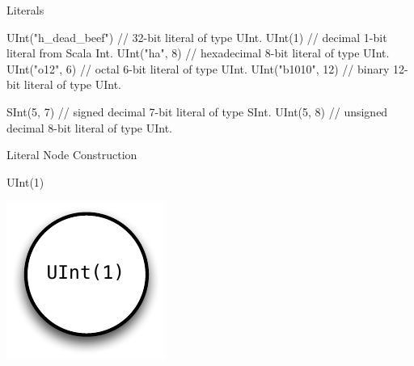 \documentclass[xcolor=pdflatex,dvipsnames,table]{beamer}
\begin{document}
\begin{frame}[fragile]{Literals}
\begin{scala}
UInt("h_dead_beef") // 32-bit literal of type UInt.
UInt(1)             // decimal 1-bit literal from Scala Int.
UInt("ha", 8)       // hexadecimal 8-bit literal of type UInt.
UInt("o12", 6)      // octal 6-bit literal of type UInt.
UInt("b1010", 12)   // binary 12-bit literal of type UInt.

SInt(5, 7)          // signed decimal 7-bit literal of type SInt.
UInt(5, 8)          // unsigned decimal 8-bit literal of type UInt.
\end{scala}
\end{frame}

\begin{frame}[fragile]{Literal Node Construction}

\begin{scala}
UInt(1)
\end{scala}

\begin{center}
\includegraphics[height=0.7\textheight]{figs/ufix.pdf} 
\end{center}

\end{frame}
\end{document}
